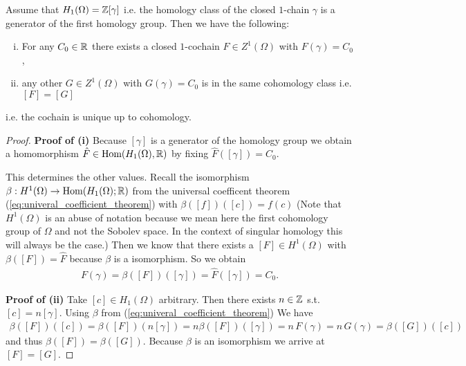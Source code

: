 \documentclass[../master_thesis.tex]{subfiles}
\begin{document}
\begin{proposition}\label{prop:uniqueness_cochain}
    Assume that $H_1(\Omega) = \mathbb{Z} [\gamma]$ i.e. the homology 
    class of the 
    closed $1$-chain $\gamma$ is a generator of the first homology group.
    Then we have the following:
    \begin{enumerate}[(i)]
        \item For any $C_0 \in \mathbb{R}$ there exists a closed $1$-cochain 
            $F \in Z^1(\Omega)$ with $F(\gamma) = C_0$,
        \item any other $G \in Z^1(\Omega)$ with $G(\gamma) = C_0$ 
            is in the same cohomology class i.e. $[F] = [G]$
    \end{enumerate}
    i.e. the cochain is unique up to cohomology.
\end{proposition}
\begin{proof}
    \textbf{Proof of (i)} %
    Because $[\gamma]$ is a generator of the homology group we  obtain a 
    homomorphism $\hat{F} \in \text{Hom}(H_1(\Omega),\mathbb{R})$ by fixing
    $\hat{F}([\gamma]) = C_0$. 
    
    This determines the other values.
    Recall the isomorphism $\beta : H^1(\Omega) \rightarrow 
    \text{Hom}(H_1(\Omega);\mathbb{R})$ from the universal coefficent theorem 
    (\ref{eq:univeral_coefficient_theorem}) with 
    $\beta([f])([c]) = f(c)$
    (Note that $H^1(\Omega)$ is an abuse of notation 
    because we mean here the first cohomology group of $\Omega$ and not the 
    Sobolev space. In the context of singular homology this will always be the
    case.)
    Then we know that there exists
    a $[F] \in H^1(\Omega)$ with $\beta([F]) = \hat{F}$ because $\beta$ is a 
    isomorphism. So we obtain
    \begin{align*}
        F(\gamma) = \beta([F])([\gamma]) = \hat{F}([\gamma]) = C_0.
    \end{align*}

    \textbf{Proof of (ii)} %
    Take $[c] \in H_1(\Omega)$ arbitrary. 
    Then there exists  $n \in \mathbb{Z}$ s.t.
    $[c] = n [\gamma]$.
    Using $\beta$ from (\ref{eq:univeral_coefficient_theorem})
    We have
    \begin{align*}
        \beta([F])([c]) = \beta([F])(n [\gamma]) 
        = n \beta([F])([\gamma]) = n \, F(\gamma) = n \, G(\gamma) = 
        \beta([G])([c])
    \end{align*}
    and thus $\beta([F]) = \beta([G])$. Because $\beta$ is an isomorphism
    we arrive at $[F] = [G]$.
\end{proof}
\end{document}
